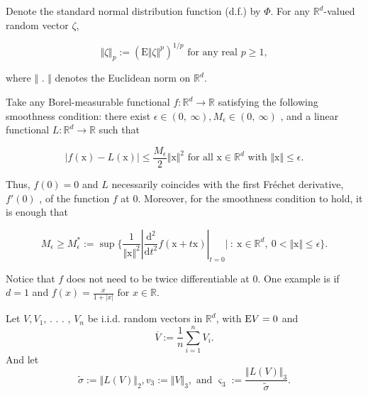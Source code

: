 Denote the standard normal distribution function (d.f.) by $\Phi$. For any $\mathbb{R}^{d}$-valued random vector $\zeta$,

\[
\Vert\zeta\Vert_{p} :=(\mathrm{E}\Vert\zeta\Vert^{p})^{1/p} \textrm{ for any real } p\geq 1,
\]

where $\Vert$ . $\Vert$ denotes the Euclidean norm on $\mathbb{R}^{d}.$

Take any Borel-measurable functional $f:\mathbb{R}^{d}\rightarrow \mathbb{R}$ satisfying the following smoothness condition: there exist $\epsilon\in(0,\ \infty), M_{\epsilon}\in(0,\ \infty)$ , and a linear functional $L:\mathbb{R}^{d}\rightarrow \mathbb{R}$ such that

\begin{theorem}
	\begin{equation}\label{eqn:smoothness}
		|f(\displaystyle \mathrm{x})-L(\mathrm{x})|\leq\frac{M_{\epsilon}}{2}\Vert \mathrm{x}\Vert^{2} \textrm{ for all } \mathrm{x}\in \mathbb{R}^{d} \textrm{ with } \Vert \mathrm{x}\Vert\leq\epsilon .
	\end{equation}
	
\end{theorem}

Thus, $f(0)=0$ and $L$ necessarily coincides with the first Fr\'{e}chet derivative, $f'(0)$ , of the function $f$ at $0$. Moreover, for the smoothness condition to hold, it is enough that 

\[
M_{\epsilon}\geq M_{\epsilon}^{*} :=\displaystyle \sup\{\frac{1}{\Vert \mathrm{x}\Vert^{2}}|\frac{\mathrm{d}^{2}}{\mathrm{d}t^{2}}f(\mathrm{x}+t\mathrm{x})|_{t=0}|\ :\ \mathrm{x}\in \mathbb{R}^{d},\ 0<\Vert \mathrm{x}\Vert\leq\epsilon\}.
\]

Notice that $f$ does not need to be twice differentiable at $0$. One example is if $d=1$ and $f(x)= \displaystyle \frac{x}{1+|x|} \textrm{ for } x\in \mathbb{R}.$


Let $V, V_{1}$, . . . , $V_{n}$ be i.i.d. random vectors in $\mathbb{R}^{d}$, with $\mathrm{E} V=0$ and
$$
\overline{V}:=\frac{1}{n}\sum_{i=1}^{n}V_{i}.
$$
And let
\begin{equation}\label{sigmatilde}
	\tilde{\sigma} :=\Vert L(V)\Vert_{2}, v_{3} :=\Vert V\Vert_{3}, \textrm{ and } \varsigma_{3} :=\displaystyle \frac{\Vert L(V)\Vert_{3}}{\tilde{\sigma}}.
\end{equation}

